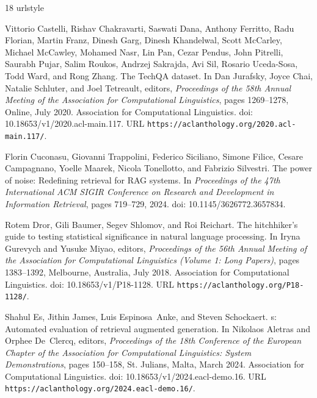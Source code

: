 \begin{thebibliography}{18}
\providecommand{\natexlab}[1]{#1}
\providecommand{\url}[1]{\texttt{#1}}
\expandafter\ifx\csname urlstyle\endcsname\relax
  \providecommand{\doi}[1]{doi: #1}\else
  \providecommand{\doi}{doi: \begingroup \urlstyle{rm}\Url}\fi

Vittorio Castelli, Rishav Chakravarti, Saswati Dana, Anthony Ferritto, Radu
  Florian, Martin Franz, Dinesh Garg, Dinesh Khandelwal, Scott McCarley,
  Michael McCawley, Mohamed Nasr, Lin Pan, Cezar Pendus, John Pitrelli, Saurabh
  Pujar, Salim Roukos, Andrzej Sakrajda, Avi Sil, Rosario Uceda-Sosa, Todd
  Ward, and Rong Zhang.
\newblock The {T}ech{QA} dataset.
\newblock In Dan Jurafsky, Joyce Chai, Natalie Schluter, and Joel Tetreault,
  editors, \emph{Proceedings of the 58th Annual Meeting of the Association for
  Computational Linguistics}, pages 1269--1278, Online, July 2020. Association
  for Computational Linguistics.
\newblock \doi{10.18653/v1/2020.acl-main.117}.
\newblock URL \url{https://aclanthology.org/2020.acl-main.117/}.

Florin Cuconasu, Giovanni Trappolini, Federico Siciliano, Simone Filice, Cesare Campagnano, Yoelle Maarek, Nicola Tonellotto, and Fabrizio Silvestri.
\newblock The power of noise: Redefining retrieval for RAG systems.
\newblock In \emph{Proceedings of the 47th International ACM SIGIR Conference on Research and Development in Information Retrieval}, pages 719--729, 2024.
\newblock \doi{10.1145/3626772.3657834}.

Rotem Dror, Gili Baumer, Segev Shlomov, and Roi Reichart.
\newblock The hitchhiker{'}s guide to testing statistical significance in
  natural language processing.
\newblock In Iryna Gurevych and Yusuke Miyao, editors, \emph{Proceedings of the
  56th Annual Meeting of the Association for Computational Linguistics (Volume
  1: Long Papers)}, pages 1383--1392, Melbourne, Australia, July 2018.
  Association for Computational Linguistics.
\newblock \doi{10.18653/v1/P18-1128}.
\newblock URL \url{https://aclanthology.org/P18-1128/}.

Shahul Es, Jithin James, Luis Espinosa~Anke, and Steven Schockaert.
s: Automated evaluation of retrieval augmented generation.
\newblock In Nikolaos Aletras and Orphee De~Clercq, editors, \emph{Proceedings
  of the 18th Conference of the European Chapter of the Association for
  Computational Linguistics: System Demonstrations}, pages 150--158, St.
  Julians, Malta, March 2024. Association for Computational Linguistics.
\newblock \doi{10.18653/v1/2024.eacl-demo.16}.
\newblock URL \url{https://aclanthology.org/2024.eacl-demo.16/}.


\end{thebibliography}
